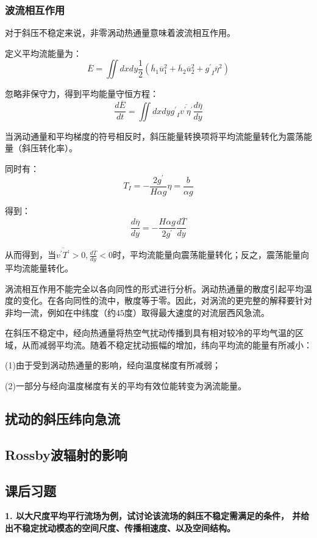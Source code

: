 \documentclass{article}
\begin{document}
\subsubsection{波流相互作用}
对于斜压不稳定来说，非零涡动热通量意味着波流相互作用。

定义平均流能量为：
$$\overline{E}=\iint{dxdy\frac{1}{2}}({{\overline{h}}_{1}}\overline{u}_{1}^{2}+{{\overline{h}}_{2}}\overline{u}_{2}^{2}+{{{g}^{\prime}}_{I}}{{\overline{\eta }}^{2}})$$

忽略非保守力，得到平均能量守恒方程：
$$\frac{d\overline{E}}{dt}=\iint{dxdy}{{{g}^{\prime}}_{I}}\overline{{v}^{\prime}{\eta }^{\prime}}\frac{d\overline{\eta }}{dy}$$

当涡动通量和平均梯度的符号相反时，斜压能量转换项将平均流能量转化为震荡能量（斜压转化率）。

同时有：
$$T_I = -\frac{2g^{\prime}}{H\alpha g}\eta = \frac{b}{\alpha g }$$

得到：
$$\frac{d\overline{\eta }}{dy} = -\frac{H\alpha g}{2g^{\prime}}\frac{d\overline{T}}{dy}$$

从而得到，当$\overline{v^{\prime}T^{\prime}}>0, \frac{d\overline{T}}{dy}<0$时，平均流能量向震荡能量转化；反之，震荡能量向平均流能量转化。

涡流相互作用不能完全以各向同性的形式进行分析。涡动热通量的散度引起平均温度的变化。在各向同性的流中，散度等于零。因此，对涡流的更完整的解释要针对非均一流，例如在中纬度（约$45$度）取得最大速度的对流层西风急流。

在斜压不稳定中，经向热通量将热空气扰动传播到具有相对较冷的平均气温的区域，从而减弱平均流。随着不稳定扰动振幅的增加，纬向平均流的能量有所减小：

(1)由于受到涡动热通量的影响，经向温度梯度有所减弱；

(2)一部分与经向温度梯度有关的平均有效位能转变为涡流能量。


\subsection{扰动的斜压纬向急流}
\subsection{Rossby波辐射的影响}
\subsection{课后习题}
\textbf{1. 以大尺度平均平行流场为例，试讨论该流场的斜压不稳定需满足的条件，
并给出不稳定扰动模态的空间尺度、传播相速度、以及空间结构。}
\end{document}
